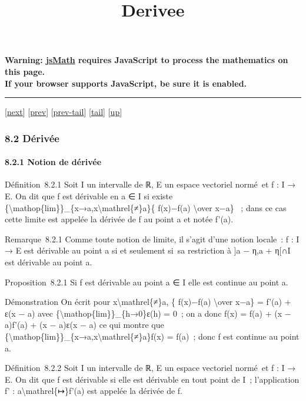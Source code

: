 \documentclass[]{article}
\title{Derivee}
\author{}
\date{}
\begin{document}
\maketitle

\textbf{Warning: \href{http://www.math.union.edu/locate/jsMath}{jsMath}
requires JavaScript to process the mathematics on this page.\\ If your
browser supports JavaScript, be sure it is enabled.}

\begin{center}\rule{3in}{0.4pt}\end{center}

{[}\href{coursse46.html}{next}{]} {[}\href{coursse44.html}{prev}{]}
{[}\href{coursse44.html\#tailcoursse44.html}{prev-tail}{]}
{[}\hyperref[tailcoursse45.html]{tail}{]}
{[}\href{coursch9.html\#coursse45.html}{up}{]}

\subsubsection{8.2 Dérivée}

\paragraph{8.2.1 Notion de dérivée}

Définition~8.2.1 Soit I un intervalle de ℝ, E un espace vectoriel
normé~et f : I → E. On dit que f est dérivable en a ∈ I si existe
\{\textbackslash{}mathop\{lim\}\}\_\{x→a,x\textbackslash{}mathrel\{≠\}a\}\{
f(x)−f(a) \textbackslash{}over x−a\} ~; dans ce cas cette limite est
appelée la dérivée de f au point a et notée f'(a).

Remarque~8.2.1 Comme toute notion de limite, il s'agit d'une notion
locale~: f : I → E est dérivable au point a si et seulement si~sa
restriction à {]}a − η,a + η{[}∩I est dérivable au point a.

Proposition~8.2.1 Si f est dérivable au point a ∈ I elle est continue au
point a.

Démonstration On écrit pour x\textbackslash{}mathrel\{≠\}a, \{ f(x)−f(a)
\textbackslash{}over x−a\} = f'(a) + ε(x − a) avec
\{\textbackslash{}mathop\{lim\}\}\_\{h→0\}ε(h) = 0~; on a donc f(x) =
f(a) + (x − a)f'(a) + (x − a)ε(x − a) ce qui montre que
\{\textbackslash{}mathop\{lim\}\}\_\{x→a,x\textbackslash{}mathrel\{≠\}a\}f(x)
= f(a)~; donc f est continue au point a.

Définition~8.2.2 Soit I un intervalle de ℝ, E un espace vectoriel
normé~et f : I → E. On dit que f est dérivable si elle est dérivable en
tout point de I~; l'application f' : a\textbackslash{}mathrel\{↦\}f'(a)
est appelée la dérivée de f.
\end{document}
